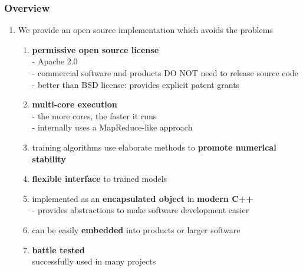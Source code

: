 \documentclass[usenames,dvipsnames]{beamer}
\begin{document}
%
%
%

\begin{frame}
\frametitle{Overview}

\begin{enumerate}[{~~$\boldsymbol{\bullet}$}]

\item We provide an open source implementation which avoids the problems

\begin{enumerate}[{$\boldsymbol{\rightarrow}$}]
\renewcommand{\itemsep}{1ex}
\item 
{\bf permissive open source license}\\
- Apache 2.0\\
- commercial software and products DO NOT need to release source code\\
- better than BSD license: provides explicit patent grants

\item
{\bf multi-core execution}\\
- the more cores, the faster it runs\\
- internally uses a MapReduce-like approach

\item
training algorithms use elaborate methods to {\bf promote numerical stability}

\item
{\bf flexible interface} to trained models

\item
implemented as an {\bf encapsulated object} in {\bf modern C++}\\
- provides abstractions to make software development easier

\item
can be easily {\bf embedded} into products or larger software\\

\item
{\bf battle tested}\\
successfully used in many projects

\end{enumerate}

\end{enumerate}
\end{frame}

%
%
%
\end{document}
